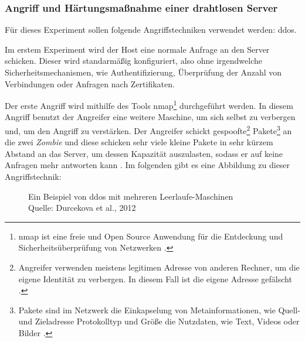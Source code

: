 \subsubsection{Angriff und Härtungsmaßnahme einer drahtlosen Server}
Für dieses Experiment sollen folgende Angriffstechniken verwendet werden: \acrfull{ddos}.

Im erstem Experiment wird der Host eine normale Anfrage an den Server schicken. Dieser wird standarmäßig konfiguriert,
also ohne irgendwelche Sicherheitsmechanismen, wie Authentifizierung, Überprüfung der Anzahl von Verbindungen oder Anfragen
nach Zertifikaten.

Der erste Angriff wird mithilfe des Tools \acrfull{nmap}\footnote{\acrshort{nmap} ist eine freie und Open 
Source Anwendung für die Entdeckung und Sicherheitsüberprüfung von Netzwerken \cite{refst:nmap}.} durchgeführt
werden. In diesem Angriff benutzt der Angreifer eine weitere Maschine, um sich selbst zu verbergen und, um den 
Angriff zu verstärken. Der Angreifer schickt gespoofte\footnote{Angreifer verwenden meistens legitimen Adresse 
von anderen Rechner, um die eigene Identität zu verbergen. In diesem Fall ist die eigene Adresse gefälscht 
\cite{refst:IPIO}.} Pakete\footnote{Pakete sind im Netzwerk die Einkapselung von Metainformationen, wie Quell-
und Zieladresse Protokolltyp und Größe die Nutzdaten, wie Text, Videos oder Bilder \cite{refbook:SWIS}.} an 
die zwei \textit{Zombie} und diese schicken sehr viele kleine Pakete in sehr kürzem Abstand an das Server, 
um dessen Kapazität auszulasten, sodass er auf keine Anfragen mehr antworten kann \cite{refip:KSDD}. Im 
folgenden gibt es eine Abbildung zu dieser Angriffstechnik:

\begin{figure}[H]
  \caption{Ein Beispiel von \acrfull{ddos} mit mehreren Leerlaufe-Maschinen
  \\ Quelle: Durcekova et al., 2012}
  \label{fig:VDSD}
\end{figure}

